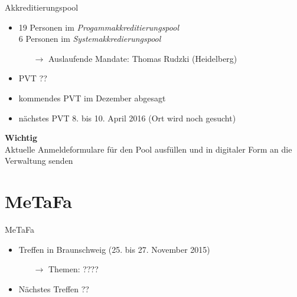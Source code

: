 \documentclass[compress,]{beamer}
\begin{document}
\begin{frame}{Akkreditierungspool}
	\begin{itemize}
		\item 19 Personen im \emph{Progammakkreditierungspool}\\
			6 Personen im \emph{Systemakkredierungspool}
			\begin{itemize}
				\item[$\rightarrow$] Auslaufende Mandate: Thomas Rudzki (Heidelberg)
			\end{itemize}
		\item PVT ??
		\item kommendes PVT im Dezember abgesagt
		\item nächstes PVT 8. bis 10. April 2016 (Ort wird noch gesucht)
	\end{itemize}
\end{frame}

\begin{frame}
	\begin{framed}
		\begin{center}
			{\Huge \textbf{Wichtig}}\\
			\vspace{0.5cm}
			{\Large Aktuelle Anmeldeformulare für den Pool ausfüllen und in digitaler Form an die Verwaltung senden}
		\end{center}
	\end{framed}
\end{frame}

\section{MeTaFa}

\begin{frame}{MeTaFa}
	\begin{itemize}
		\item Treffen in Braunschweig (25. bis 27. November 2015)
			\begin{itemize}
				\item[$\rightarrow$] Themen: ????
			\end{itemize}
		\item Nächstes Treffen ??
	\end{itemize}
\end{frame}
\end{document}

